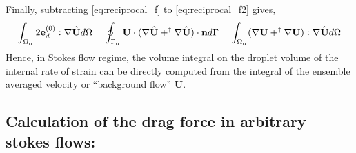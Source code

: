 Finally, subtracting  \ref{eq:reciprocal_f} to \ref{eq:reciprocal_f2} gives,
\begin{equation}
    \int_{\Omega_{\alpha}}  2\textbf{e}_d^{(0)} : \mathbf{\nabla} \hat{\textbf{U}}  d\Omega
    = 
    \oint_{\Gamma_{\alpha}}   \textbf{U} \cdot (\mathbf{\nabla} \hat{\textbf{U}} + ^\dagger\mathbf{\nabla} \hat{\textbf{U}})  \cdot \textbf{n} d\Gamma
    = 
    \int_{\Omega_{\alpha}}   (\mathbf{\nabla} {\textbf{U}} + ^\dagger\mathbf{\nabla} {\textbf{U}}) : \mathbf{\nabla} \hat{\textbf{U}}  d\Omega
\end{equation}
Hence, in Stokes flow regime, the volume integral on the droplet volume of the internal rate of strain can be directly computed from the integral of the ensemble averaged velocity or ``background flow'' $\textbf{U}$. 


\subsection{Calculation of the drag force in arbitrary stokes flows:}

